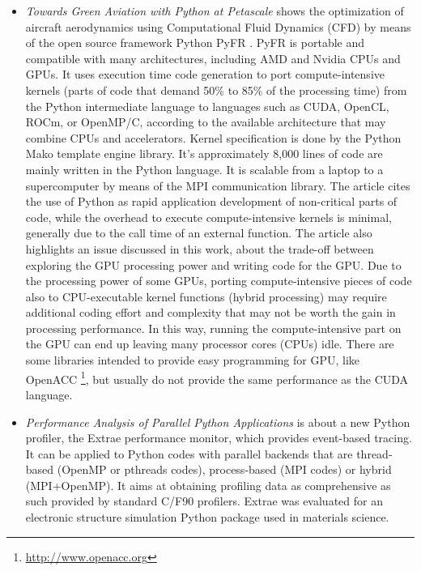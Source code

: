 \begin{itemize}

\item \textit {Towards Green Aviation with Python at Petascale} \cite {Vincent2016} shows the optimization of aircraft aerodynamics using Computational Fluid Dynamics (CFD) by means of the open source framework Python PyFR \cite {Witherden2014}. PyFR is portable and compatible with many architectures, including AMD and Nvidia CPUs and GPUs. It uses execution time code generation to port compute-intensive kernels (parts of code that demand 50\% to 85\% of the processing time) from the Python intermediate language to languages such as CUDA, OpenCL, ROCm, or OpenMP/C, according to the available architecture that may combine CPUs and accelerators. Kernel specification is done by the Python Mako template engine library. It's approximately 8,000 lines of code are mainly written in the Python language. It is scalable from a laptop to a supercomputer by means of the MPI communication library. The article cites the use of Python as rapid application development of non-critical parts of code, while the overhead to execute compute-intensive kernels is minimal, generally due to the call time of an external function. The article also highlights an issue discussed in this work, about the trade-off between exploring the GPU processing power and writing code for the GPU. Due to the processing power of some GPUs, porting compute-intensive pieces of code also to CPU-executable kernel functions (hybrid processing) may require additional coding effort and complexity that may not be worth the gain in processing performance. In this way, running the compute-intensive part on the GPU can end up leaving many processor cores (CPUs) idle. There are some libraries intended to provide easy programming for GPU, like OpenACC \footnote{\url{http://www.openacc.org}}, but usually do not provide the same performance as the CUDA language.

\item \textit {Performance Analysis of Parallel Python Applications} \cite {Wagner2017} is about a new Python profiler, the Extrae performance monitor, which provides event-based tracing. It can be applied to Python codes with parallel backends that are thread-based (OpenMP or pthreads codes), process-based (MPI codes) or hybrid (MPI+OpenMP). It aims at obtaining profiling data as comprehensive as such provided by standard C/F90 profilers. Extrae was evaluated for an electronic structure simulation Python package used in materials science. 


\end{itemize}
